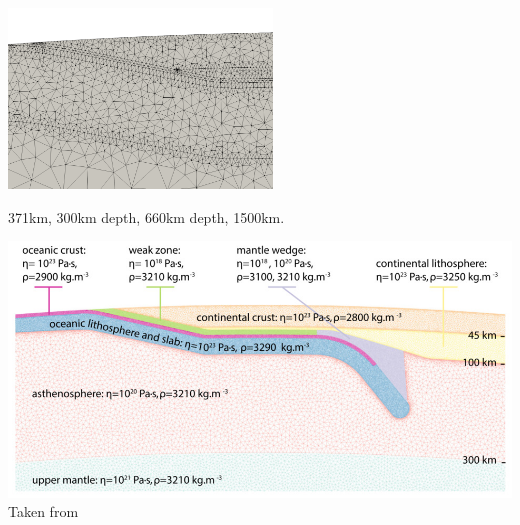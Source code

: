 \includegraphics[width=7cm]{python_codes/fieldstone_44/grid_lowres5}

371km, 300km depth, 660km depth, 1500km.

\begin{center}
\includegraphics[width=14cm]{python_codes/fieldstone_44/sifg19}\\
{\captionfont Taken from \cite{sifg19}}
\end{center}
